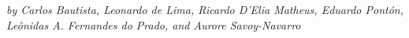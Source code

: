\begin{center}
{\it{by Carlos Bautista, Leonardo de Lima, Ricardo D'Elia Matheus, Eduardo Pont\'on, Le\^onidas A. Fernandes do Prado, and Aurore Savoy-Navarro}}
\end{center}

\label{sec9:MCHMtthh}
